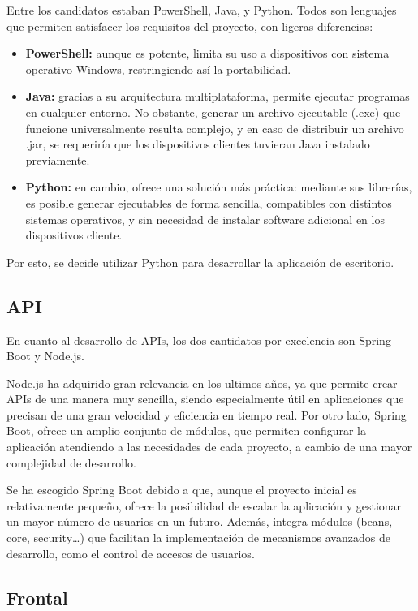 Entre los candidatos estaban PowerShell, Java, y Python.
Todos son lenguajes que permiten satisfacer los requisitos del proyecto, con ligeras diferencias:
\begin{itemize}
    \item \textbf{PowerShell:} aunque es potente, limita su uso a dispositivos con sistema operativo Windows,
    restringiendo así la portabilidad.
    \item \textbf{Java:} gracias a su arquitectura multiplataforma, permite ejecutar programas en cualquier entorno.
    No obstante, generar un archivo ejecutable (.exe) que funcione universalmente resulta complejo, y en caso de
    distribuir un archivo .jar, se requeriría que los dispositivos clientes tuvieran Java instalado previamente.
    \item \textbf{Python:} en cambio, ofrece una solución más práctica: mediante sus librerías, es posible generar
    ejecutables de forma sencilla, compatibles con distintos sistemas operativos, y sin necesidad de instalar
    software adicional en los dispositivos cliente.
\end{itemize}

Por esto, se decide utilizar Python\cite{python:docs} para desarrollar la aplicación de escritorio.

\subsection{API}\label{subsec:api}

En cuanto al desarrollo de APIs, los dos cantidatos por excelencia son Spring Boot y Node.js.

Node.js ha adquirido gran relevancia en los ultimos años, ya que permite crear APIs de una manera muy sencilla,
siendo especialmente útil en aplicaciones que precisan de una gran velocidad y eficiencia en tiempo real.
Por otro lado, Spring Boot, ofrece un amplio conjunto de módulos, que permiten configurar la aplicación atendiendo
a las necesidades de cada proyecto, a cambio de una mayor complejidad de desarrollo.

Se ha escogido Spring Boot\cite{spring:docs} debido a que, aunque el proyecto inicial es relativamente pequeño, ofrece la  posibilidad
de escalar la aplicación y gestionar un mayor número de usuarios en un futuro.
Además, integra módulos (beans, core, security\ldots) que facilitan la implementación de mecanismos avanzados de desarrollo,
como el control de accesos de usuarios.

\subsection{Frontal}\label{subsec:frontal}

